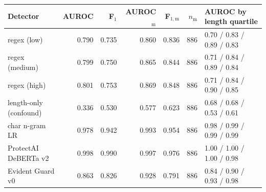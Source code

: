 \begin{tabular}{@{}lrrrrrl@{}}
\toprule
Detector & AUROC & F$_1$ & AUROC$_\mathrm{m}$ & F$_{1,\mathrm{m}}$ & $n_\mathrm{m}$ & AUROC by length quartile \\
\midrule
regex (low) & 0.790 & 0.735 & 0.860 & 0.836 & 886 & 0.70 / 0.83 / 0.89 / 0.83 \\
regex (medium) & 0.799 & 0.750 & 0.865 & 0.844 & 886 & 0.71 / 0.84 / 0.89 / 0.84 \\
regex (high) & 0.801 & 0.753 & 0.869 & 0.848 & 886 & 0.71 / 0.84 / 0.90 / 0.85 \\
length-only (confound) & 0.336 & 0.530 & 0.577 & 0.623 & 886 & 0.68 / 0.68 / 0.53 / 0.61 \\
char n-gram LR & 0.978 & 0.942 & 0.993 & 0.954 & 886 & 0.98 / 0.99 / 0.99 / 0.99 \\
ProtectAI DeBERTa v2 & 0.998 & 0.990 & 0.997 & 0.976 & 886 & 1.00 / 1.00 / 1.00 / 0.98 \\
Evident Guard v0 & 0.863 & 0.826 & 0.928 & 0.791 & 886 & 0.84 / 0.90 / 0.93 / 0.98 \\
\bottomrule
\end{tabular}
